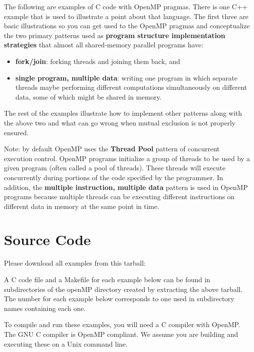 \documentclass[letterpaper,10pt,openany,oneside]{sphinxmanual}
\begin{document}
The following are examples of C code with OpenMP pragmas.  There is one C++
example that is used to illustrate a point about that language. The first
three are basic illustrations so you can get used to the OpenMP pragmas and
conceptualize the two primary patterns used as
\textbf{program structure implementation strategies} that almost all shared-memory
parallel programs have:
\begin{itemize}
\item {} 
\textbf{fork/join}:  forking threads and joining them back, and

\item {} 
\textbf{single program, multiple data}:  writing one program in which separate threads maybe performing different computations simultaneously on different data, some of which might be shared in memory.

\end{itemize}

The rest of the examples illustrate how to implement other patterns
along with the above two and what can go wrong when mutual exclusion
is not properly ensured.

Note: by default OpenMP uses the \textbf{Thread Pool} pattern of concurrent execution control.
OpenMP programs initialize a group of threads to be used by a given program
(often called a pool of threads).  These threads will execute concurrently
during portions of the code specified by the programmer.  In addition, the \textbf{multiple instruction, multiple data} pattern is used in OpenMP programs because multiple threads can be executing different instructions on different data in memory at the same point in time.


\section{Source Code}
\label{SharedMemory/OpenMP_Patternlets:source-code}
Please download all examples from this tarball:

A C code file and a Makefile for each example below can be found in
subdirectories of the openMP directory created by extracting the above tarball.
The number for each example below corresponds to one used in subdirectory
names containing each one.

To compile and run these examples, you will need a C compiler with OpenMP.  The GNU C compiler is OpenMP compliant.  We assume you are building and executing these on a Unix command line.
\end{document}
